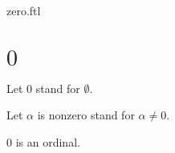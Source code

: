 \documentclass{naproche-library}
\begin{document}
\begin{smodule}{zero.ftl}

  \section*{$0$}

  \begin{forthel}
    Let $0$ stand for $\emptyset$.

    Let $\alpha$ is nonzero stand for $\alpha \neq 0$.
  \end{forthel}

  \begin{proposition}[forthel,id=SET_THEORY_02_8483196888940544,printid]
    $0$ is an ordinal.
  \end{proposition}
\end{smodule}
\end{document}
